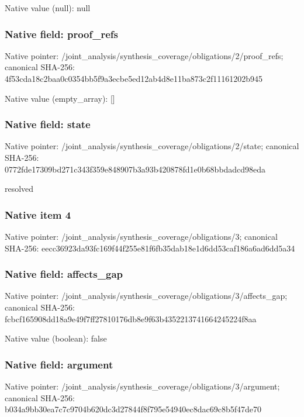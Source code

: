 \documentclass[10pt,a4paper]{article}
\begin{document}
Native value (null): null

\subsubsection{Native field: proof\_\allowbreak{}refs}
Native pointer: /joint\_\allowbreak{}analysis/synthesis\_\allowbreak{}coverage/obligations/2/proof\_\allowbreak{}refs; canonical SHA-256: 4f53cda18c2baa0c0354bb5f9a3ecbe5ed12ab4d8e11ba873c2f11161202b945

Native value (empty\_\allowbreak{}array): []

\subsubsection{Native field: state}
Native pointer: /joint\_\allowbreak{}analysis/synthesis\_\allowbreak{}coverage/obligations/2/state; canonical SHA-256: 0772fde17309bd271c343f359e848907b3a93b420878fd1e0b68bbdadcd98eda

\begingroup\raggedright\sloppy resolved\par\endgroup

\subsubsection{Native item 4}
Native pointer: /joint\_\allowbreak{}analysis/synthesis\_\allowbreak{}coverage/obligations/3; canonical SHA-256: eecc36923da93fc169f44f255e81f6fb35dab18e1d6dd53caf186a6ad6dd5a34

\subsubsection{Native field: affects\_\allowbreak{}gap}
Native pointer: /joint\_\allowbreak{}analysis/synthesis\_\allowbreak{}coverage/obligations/3/affects\_\allowbreak{}gap; canonical SHA-256: fcbcf165908dd18a9e49f7ff27810176db8e9f63b4352213741664245224f8aa

Native value (boolean): false

\subsubsection{Native field: argument}
Native pointer: /joint\_\allowbreak{}analysis/synthesis\_\allowbreak{}coverage/obligations/3/argument; canonical SHA-256: b034a9bb30ea7c7c9704b620dc3d27844f8f795e54940ec8dac69c8b5f47de70
\end{document}
